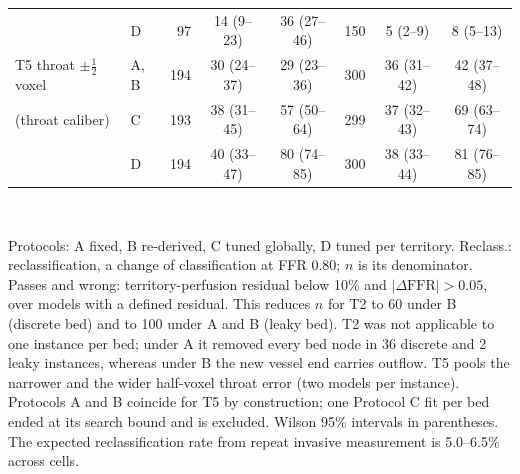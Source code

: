 \documentclass[journal,twoside,web]{ieeecolor}
\begin{document}
\begin{table}[!t]
\begin{tabular}{@{}llrccrcc@{}}
 & D & 97 & 14 (9--23) & 36 (27--46) & 150 & 5 (2--9) & 8 (5--13) \\
\addlinespace[2pt]
T5 throat $\pm\tfrac12$ voxel & A, B & 194 & 30 (24--37) & 29 (23--36) & 300 & 36 (31--42) & 42 (37--48) \\
\quad (throat caliber) & C & 193 & 38 (31--45) & 57 (50--64) & 299 & 37 (32--43) & 69 (63--74) \\
 & D & 194 & 40 (33--47) & 80 (74--85) & 300 & 38 (33--44) & 81 (76--85) \\
\bottomrule
\end{tabular}
\\[2pt]
\parbox{\textwidth}{\footnotesize Protocols: A fixed, B re-derived, C tuned globally, D tuned per territory. Reclass.: reclassification, a change of classification at FFR 0.80; $n$ is its denominator. Passes and wrong: territory-perfusion residual below 10\% and $|\Delta\mathrm{FFR}| > 0.05$, over models with a
defined residual. This reduces $n$ for T2 to 60 under B (discrete bed) and to 100 under A and B (leaky bed). T2 was not applicable to one instance per bed; under A it removed every bed node in 36 discrete and 2 leaky instances, whereas under B the new vessel end carries outflow. T5 pools the narrower and the wider half-voxel throat error (two models per instance). Protocols A and B coincide for T5 by construction; one Protocol C fit per bed ended at its search bound and is excluded. Wilson 95\% intervals in parentheses. The expected reclassification
rate from repeat invasive measurement is 5.0--6.5\% across cells.}
\end{table}
\end{document}
